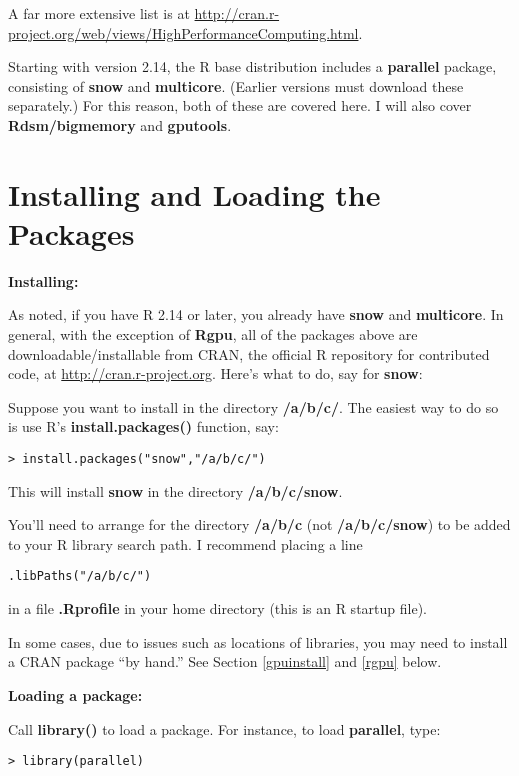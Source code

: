 A far more extensive list is at
\url{http://cran.r-project.org/web/views/HighPerformanceComputing.html}.

Starting with version 2.14, the R base distribution includes a {\bf
parallel} package, consisting of {\bf snow} and {\bf multicore}.
(Earlier versions must download these separately.)  For this reason,
both of these are covered here.  I will also cover {\bf Rdsm/bigmemory}
and {\bf gputools}.  

\section{Installing and Loading the Packages}

{\bf Installing:}

As noted, if you have R 2.14 or later, you already have {\bf snow} and
{\bf multicore}.  In general, with the exception of {\bf Rgpu}, all of
the packages above are downloadable/installable from CRAN, the official
R repository for contributed code, at \url{http://cran.r-project.org}.
Here's what to do, say for {\bf snow}:

Suppose you want to install in the directory {\bf /a/b/c/}.  The easiest
way to do so is use R's {\bf install.packages()} function, say:

\begin{lstlisting}
> install.packages("snow","/a/b/c/")
\end{lstlisting}

This will install {\bf snow} in the directory {\bf /a/b/c/{\bf snow}}.

You'll need to arrange for the directory {\bf /a/b/c} (not {\bf
/a/b/c/snow}) to be added to your R library search path.  I recommend
placing a line

\begin{lstlisting}
.libPaths("/a/b/c/")
\end{lstlisting}

in a file {\bf .Rprofile} in your home directory (this is an R startup
file).

In some cases, due to issues such as locations of libraries, you may
need to install a CRAN package ``by hand.''  See Section \ref{gpuinstall} 
and \ref{rgpu} below.

{\bf Loading a package:}

Call {\bf library()} to load a package.  For instance, to load {\bf
parallel}, type:

\begin{lstlisting}
> library(parallel)
\end{lstlisting}

